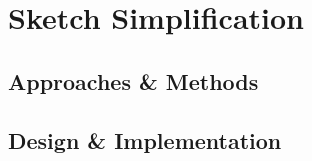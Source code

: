 \chapter{Sketch Simplification}
\label{chapterlabel4}
\section{Approaches \& Methods}
\section{Design \& Implementation}


